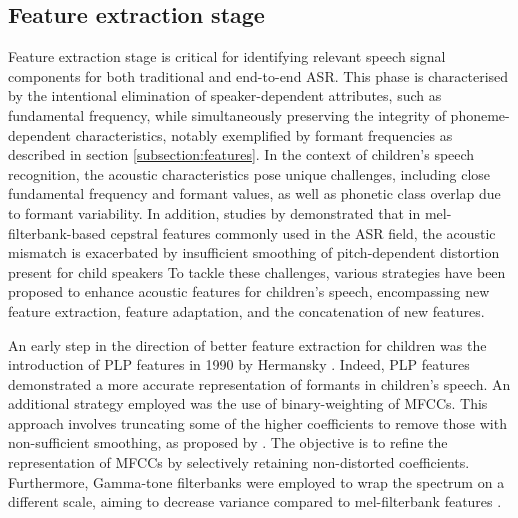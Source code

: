 \subsection{Feature extraction stage}%
Feature extraction stage is critical for identifying relevant speech signal components for both traditional and end-to-end \ac{ASR}. This phase is characterised by the intentional elimination of speaker-dependent attributes, such as fundamental frequency, while simultaneously preserving the integrity of phoneme-dependent characteristics, notably exemplified by formant frequencies as described in section \ref{subsection:features}. In the context of children's speech recognition, the acoustic characteristics pose unique challenges, including close fundamental frequency and formant values, as well as phonetic class overlap due to formant variability. In addition, studies by \cite{ghai2009exploring,ghai2011addressing} demonstrated that in mel-filterbank-based cepstral features commonly used in the \ac{ASR} field, the acoustic mismatch is exacerbated by insufficient smoothing of pitch-dependent distortion present for child speakers To tackle these challenges, various strategies have been proposed to enhance acoustic features for children's speech, encompassing new feature extraction, feature adaptation, and the concatenation of new features.


An early step in the direction of better feature extraction for children was the introduction of \ac{PLP} features in 1990 by Hermansky \cite{Hermansky1990PerceptualLP}. Indeed, \ac{PLP} features demonstrated  a more accurate representation of formants in children's speech.  An additional strategy employed was the use of binary-weighting of \acp{MFCC}. This approach involves truncating some of the higher coefficients to remove those with non-sufficient smoothing, as proposed by \cite{ghai2009exploring}. The objective is to refine the representation of \acp{MFCC} by selectively retaining non-distorted coefficients. Furthermore, Gamma-tone filterbanks were employed to wrap the spectrum on a different scale, aiming to decrease variance compared to mel-filterbank features \cite{shahnawazuddin2023gammatone}.

